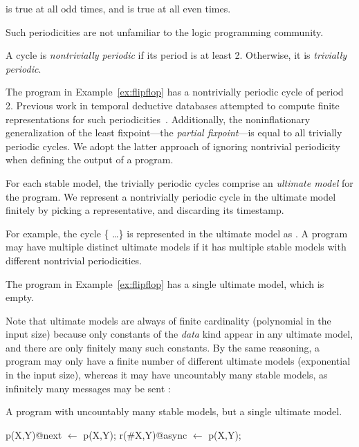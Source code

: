  is true at all odd times, and  is true at all even times.

Such periodicities are not unfamiliar to the logic programming community.  

\begin{definition}
A cycle is {\em nontrivially periodic} if its period is at least 2.  Otherwise, it is {\em trivially periodic}.
\end{definition}

The program in Example~\ref{ex:flipflop} has a nontrivially periodic cycle of period 2.  Previous work in temporal deductive databases attempted to compute finite representations for such periodicities~\cite{tdd-infinite}.  Additionally, the noninflationary generalization of the least fixpoint---the {\em partial fixpoint}---is equal to all trivially periodic cycles.  We adopt the latter approach of ignoring nontrivial periodicity when defining the output of a \lang program.

\begin{definition}
For each stable model, the trivially periodic cycles comprise an {\em ultimate model} for the program.  We represent a nontrivially periodic cycle in the ultimate model finitely by picking a representative, and discarding its timestamp.
\end{definition}

For example, the cycle \{ \ldots\} is represented in the ultimate model as .  A program may have multiple distinct ultimate models if it has multiple stable models with different nontrivial periodicities.

The program in Example~\ref{ex:flipflop} has a single ultimate model, which is empty.

Note that ultimate models are always of finite cardinality (polynomial in the input size) because only constants of the {\em data} kind appear in any ultimate model, and there are only finitely many such constants.  By the same reasoning, a \lang program may only have a finite number of different ultimate models (exponential in the input size), whereas it may have uncountably many stable models, as infinitely many messages may be sent :

\begin{example}
A \lang program with uncountably many stable models, but a single ultimate model.

\begin{Dedalus}
p(X,Y)@next \(\leftarrow\) p(X,Y);
r(#X,Y)@async \(\leftarrow\) p(X,Y);
\end{Dedalus}
\end{example}

